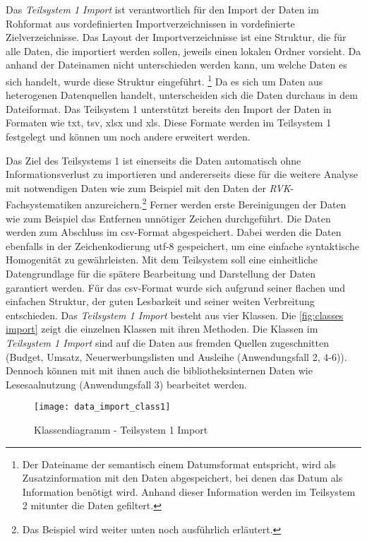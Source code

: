     Das \textit{Teilsystem 1 Import} ist verantwortlich für den Import der Daten im Rohformat aus vordefinierten Importverzeichnissen 
    in vordefinierte Zielverzeichnisse. Das Layout der Importverzeichnisse ist eine Struktur, die für alle Daten, die importiert werden sollen,
    jeweils einen lokalen Ordner vorsieht. Da anhand der Dateinamen nicht unterschieden werden kann, um welche Daten es sich handelt, wurde diese Struktur eingeführt. 
    \footnote{Der Dateiname der semantisch einem Datumsformat entspricht, wird als Zusatzinformation mit den Daten abgespeichert, bei denen das Datum als Information benötigt wird.
    Anhand dieser Information werden im Teilsystem 2 mitunter die Daten gefiltert.} 
    Da es sich um Daten aus heterogenen Datenquellen handelt, unterscheiden sich die Daten durchaus in dem Dateiformat. 
    Das Teilsystem 1 unterstützt bereits den Import der Daten in Formaten wie txt, tsv, xlsx und xls. Diese Formate werden im Teilsystem 1 festgelegt
    und können um noch andere erweitert werden.
    
    Das Ziel des Teilsystems 1 ist einerseits die Daten automatisch ohne Informationsverlust zu importieren 
    und andererseits diese für die weitere Analyse mit notwendigen Daten wie zum Beispiel mit den Daten 
    der \textit{\acrshort{RVK}}-Fachsystematiken anzureichern.\footnote{Das Beispiel wird weiter unten noch ausführlich erläutert.}
    Ferner werden erste Bereinigungen der Daten wie zum Beispiel das Entfernen unnötiger Zeichen durchgeführt. Die Daten werden zum Abschluss im csv-Format abgespeichert. 
    Dabei werden die Daten ebenfalls in der Zeichenkodierung utf-8 gespeichert, um eine einfache syntaktische Homogenität zu gewährleisten.
    Mit dem Teilsystem soll eine einheitliche Datengrundlage für die spätere 
    Bearbeitung und Darstellung der Daten garantiert werden. Für das csv-Format wurde sich aufgrund seiner flachen und einfachen Struktur, der guten Lesbarkeit
    und seiner weiten Verbreitung entschieden.
    Das \textit{Teilsystem 1 Import} besteht aus vier Klassen. Die \autoref{fig:classes import} zeigt die einzelnen Klassen mit ihren Methoden.
    Die Klassen im \textit{Teilsystem 1 Import} sind auf die Daten aus fremden Quellen zugeschnitten
    (Budget, Umsatz, Neuerwerbungslisten und Ausleihe (Anwendungsfall 2, 4-6)). Dennoch können mit mit ihnen auch die bibliotheksinternen Daten
    wie Lesesaalnutzung (Anwendungsfall 3) bearbeitet werden. 
    \begin{figure}[H]
        \centering
            \texttt{[image: data\_import\_class1]}
            \caption{Klassendiagramm - Teilsystem 1 Import}
            \label{fig:classes import}
    \end{figure}

